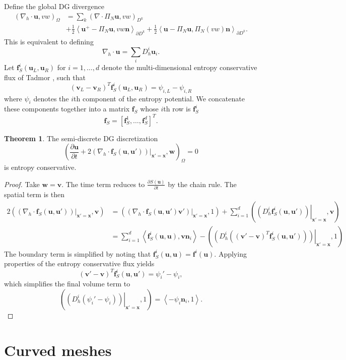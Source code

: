 \documentclass[preprint,10pt]{article}
\theoremstyle{definition}
\theoremstyle{lemma}
\theoremstyle{theorem}
\newtheorem{theorem}{Theorem}
\theoremstyle{assumption}
\newcommand{\pd}[2]{\frac{\partial#1}{\partial#2}}
\newcommand{\LRp}[1]{\left( #1 \right)}
\newcommand{\LRs}[1]{\left[ #1 \right]}
\newcommand{\LRa}[1]{\left\langle #1 \right\rangle}
\newcommand{\LRl}[1]{\left. \LRp{#1} \right|}
\newcommand{\Grad} {\ensuremath{\nabla}}
\renewcommand{\d}{\partial}
\begin{document}
Define the global DG divergence
\begin{align*}
\LRp{\Grad_h \cdot \bm{u},vw}_{\Omega} &= \sum_k \LRp{\Grad \cdot \Pi_N\bm{u},vw}_{D^k} \\
& + \frac{1}{2}\LRa{ \bm{u}^+ - \Pi_N\bm{u},vw\bm{n}}_{\d D^k} +  \frac{1}{2}\LRa{ \bm{u} - \Pi_N\bm{u},\Pi_N\LRp{vw}\bm{n}}_{\d D^k}.
\end{align*}
This is equivalent to defining
\[
\Grad_h \cdot\bm{u} = \sum_i D^i_h \bm{u}_i.  
\]
Let $\bm{f}^i_S(\bm{u}_L,\bm{u}_R)$ for $i= 1,\ldots,d$ denote the multi-dimensional entropy conservative flux of Tadmor \cite{tadmor1987numerical}, such that
\[
\LRp{\bm{v}_L-\bm{v}_R}^T\bm{f}^i_S(\bm{u}_L,\bm{u}_R) = \psi_{i,L} - \psi_{i,R}
\]
where $\psi_i$ denotes the $i$th component of the entropy potential.  We concatenate these components together into a matrix $\bm{f}_S$ whose $i$th row is $\bm{f}^i_S$
\[
\bm{f}_S = \LRs{\bm{f}^1_S,\ldots,\bm{f}^d_S}^T.  
\]
\begin{theorem}
\label{thm:ec}
The semi-discrete DG discretization 
\[
\LRp{\pd{\bm{u}}{t} + 2\LRl{{\Grad_h\cdot \bm{f}_S(\bm{u},\bm{u}')}}_{\bm{x}'=\bm{x}},\bm{w}}_{\Omega} = 0
\]
is entropy conservative.  
\end{theorem}
\begin{proof}
Take $\bm{w} = \bm{v}$.  The time term reduces to $\pd{S(\bm{u})}{t}$ by the chain rule.  The spatial term is then
\begin{align*}
2\LRp{\LRl{{\Grad_h\cdot \bm{f}_S(\bm{u},\bm{u}')}}_{\bm{x}'=\bm{x}},\bm{v}} &= \LRp{\LRl{{\Grad_h\cdot \bm{f}_S(\bm{u},\bm{u}')}\bm{v}'}_{\bm{x}'=\bm{x}},{1}} + \sum_{i=1}^d  \LRp{\LRl{{D^i_h \bm{f}^i_S(\bm{u},\bm{u}')}}_{\bm{x}'=\bm{x}},\bm{v}} \\
&= \sum_{i=1}^d\LRa{\bm{f}^i_S(\bm{u},\bm{u}),\bm{v}\bm{n}_i} - \LRp{\LRl{{D^i_h \LRp{\LRp{\bm{v}'-\bm{v}}^T\bm{f}^i_S(\bm{u},\bm{u}')}}}_{\bm{x}'=\bm{x}},{1}}
\end{align*}
The boundary term is simplified by noting that $\bm{f}^i_S(\bm{u},\bm{u}) = \bm{f}^i(\bm{u})$.  
Applying properties of the entropy conservative flux yields
\[
\LRp{\bm{v}'-\bm{v}}^T\bm{f}^i_S(\bm{u},\bm{u}') = \psi_i' - \psi_i,
\]
which simplifies the final volume term to
\[
\LRp{\LRl{D^i_h \LRp{\psi_i' - \psi_i}}_{\bm{x}'=\bm{x}},{1}} = \LRa{-\psi_i\bm{n}_i,1}.
\]
\end{proof}

\section{Curved meshes}
\end{document}
